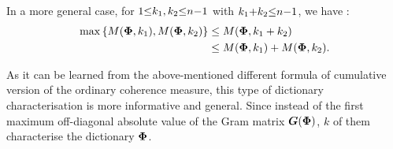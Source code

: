 In a more general case, for $1 {\leq} k_1,k_2 {\leq} n {-} 1$ with $k_1 {+} k_2 {\leq} n {-} 1$, we have \cite{Foucart2013}:
\begin{gather*}
\begin{aligned}
\max \left\lbrace M(\boldsymbol{\Phi} , k_1) , M(\boldsymbol{\Phi} , k_2) \right\rbrace &\leq M(\boldsymbol{\Phi} , k_1+k_2) \\
&\leq M(\boldsymbol{\Phi} , k_1) + M(\boldsymbol{\Phi} , k_2).
\end{aligned}
\end{gather*}

As it can be learned from the above-mentioned different formula of cumulative version of the ordinary coherence measure, this type of dictionary characterisation is more informative and general.
Since instead of the first maximum off-diagonal absolute value of the Gram matrix $\boldsymbol{G}(\boldsymbol{\Phi})$, $k$ of them characterise the dictionary $\boldsymbol{\Phi}$.